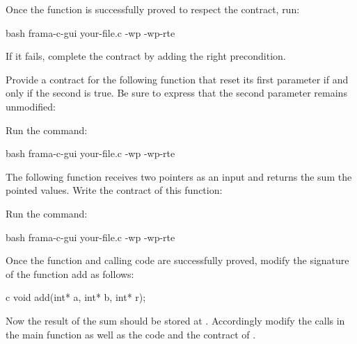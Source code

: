 Once the function is successfully proved to respect the contract, run:


\begin{CodeBlock}{bash}
frama-c-gui your-file.c -wp -wp-rte
\end{CodeBlock}


If it fails, complete the contract by adding the right precondition.






Provide a contract for the following function that reset its first parameter
if and only if the second is true. Be sure to express that the second parameter
remains unmodified:




Run the command:


\begin{CodeBlock}{bash}
frama-c-gui your-file.c -wp -wp-rte
\end{CodeBlock}





The following function receives two pointers as an input and returns the
sum the pointed values. Write the contract of this function:






Run the command:



\begin{CodeBlock}{bash}
frama-c-gui your-file.c -wp -wp-rte
\end{CodeBlock}



Once the function and calling code are successfully proved, modify the
signature of the function add as follows:



\begin{CodeBlock}{c}
void add(int* a, int* b, int* r);
\end{CodeBlock}


Now the result of the sum should be stored at . Accordingly
modify the calls in the main function as well as the code and the contract
of .






